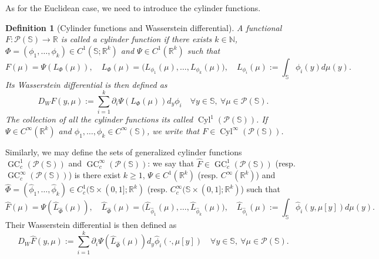 \documentclass[10pt,leqno]{amsart}
\numberwithin{equation}{section}
\newtheorem{df}[teorema]{Definition}
\newcommand{\R}{\mathbb{R}}
\newcommand{\N}{\mathbb{N}}
\newcommand{\PP}{\mathcal{P}}
\newcommand{\Ss}{\mathbb{S}}
\begin{document}
As for the Euclidean case, we need to introduce the cylinder functions.

\begin{df}[Cylinder functions and Wasserstein differential]\label{def cyl func manifold and wass grad}
    A functional $F:\PP(\Ss)\to\R$ is called a cylinder function if there exists $k\in \N$, $\Phi = (\phi_1,\dots,\phi_k)\in C^1(\Ss;\R^k)$ and $\Psi\in C^1(\R^k)$ such that 
    \begin{equation}\label{cyl functions manifold}
        F(\mu) = \Psi\left( L_\Phi(\mu) \right), \quad L_\Phi(\mu) =  \big(L_{\phi_1}(\mu) ,\dots , L_{\phi_k}(\mu)\big), \quad  L_{\phi_i}(\mu) := \int_{\Ss} \phi_i(y) d\mu(y).
    \end{equation}
    Its Wasserstein differential is then defined as 
    \begin{equation}\label{wass gradient cyl manifold}
        D_W F(y,\mu):= \sum_{i=1}^k \partial_{i}\Psi\left( L_{\Phi}(\mu)\right) d_y \phi_i \quad \forall y\in \Ss, \ \forall\mu \in \PP(\Ss).
    \end{equation}
    The collection of all the cylinder functions its called $\operatorname{Cyl}^1(\PP(\Ss))$. If $\Psi \in C^\infty(\R^k)$ and $\phi_1,\dots,\phi_k \in C^\infty(\Ss)$, we write that $F\in \operatorname{Cyl}^\infty(\PP(\Ss))$. 
\end{df}

Similarly, we may define the sets of generalized cylinder functions $\operatorname{GC}_c^1(\PP(\Ss))$ and $\operatorname{GC}_c^\infty(\PP(\Ss))$: we say that $\hat{F} \in \operatorname{GC}_c^1(\PP(\Ss))$ (resp. $\operatorname{GC}_c^\infty(\PP(\Ss))$) is there exist $k\geq 1$, $\Psi \in C^1(\R^k)$ (resp. $C^\infty(\R^k)$) and $\hat{\Phi} = (\hat{\phi}_1,\dots,\hat{\phi}_k)\in C^1_c(\Ss\times(0,1];\R^k)$ (resp. $C_c^\infty(\Ss\times(0,1];\R^k)$) such that 
    \begin{equation}\label{gen cyl functions manifold}
        \hat{F}(\mu) = \Psi\left( \hat{L}_{\hat{\Phi}}(\mu) \right), \quad\hat{L}_{\hat{\Phi}}(\mu) =  \big(\hat{L}_{\hat{\phi}_1}(\mu) ,\dots , \hat{L}_{\hat{\phi}_k}(\mu)\big), \quad  \hat{L}_{\hat{\phi}_i}(\mu) := \int_{\Ss} \hat{\phi}_i(y,\mu[y]) d\mu(y).
    \end{equation}
Their Wasserstein differential is then defined as 
\begin{equation}\label{wass gradient gen cyl manifold}
        D_W \hat{F}(y,\mu):= \sum_{i=1}^k \partial_{i}\Psi\left( \hat{L}_{\hat{\Phi}}(\mu)\right) d_y \hat{\phi}_i(\cdot,\mu[y]) \quad \forall y\in \Ss, \ \forall\mu \in \PP(\Ss).
    \end{equation}
\end{document}
